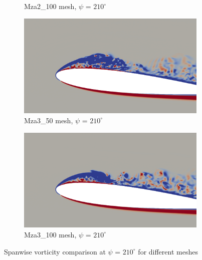 \begin{figure}[H]
\begin{subfigure}[b]{0.475\textwidth}
		\caption{Mza2\_100 mesh, $\psi$ = $210^\circ$}
		\label{fig:Mza2_100_sp_psi210}
	\end{subfigure}
	\begin{subfigure}[b]{0.475\textwidth}
	\centering
	\includegraphics[width=1\textwidth]{figures/zonal_adapt_results/vorticity_plots/v2/Mza3_50/spavg/phase_210.png}
	\caption{Mza3\_50 mesh, $\psi$ = $210^\circ$}
	\label{fig:Mza3_50_sp_psi210}
\end{subfigure}
	\begin{subfigure}[b]{0.475\textwidth}
		\centering
		\includegraphics[width=1\textwidth]{figures/zonal_adapt_results/vorticity_plots/v2/Mza3_100/spavg/phase_210.png}
		\caption{Mza3\_100 mesh, $\psi$ = $210^\circ$}
		\label{fig:Mza3_100_sp_psi210}
	\end{subfigure}
	\caption{Spanwise vorticity comparison at $\psi$ = $210^\circ$ for different meshes}
	\label{fig:vorticity_sp_210}
\end{figure}



